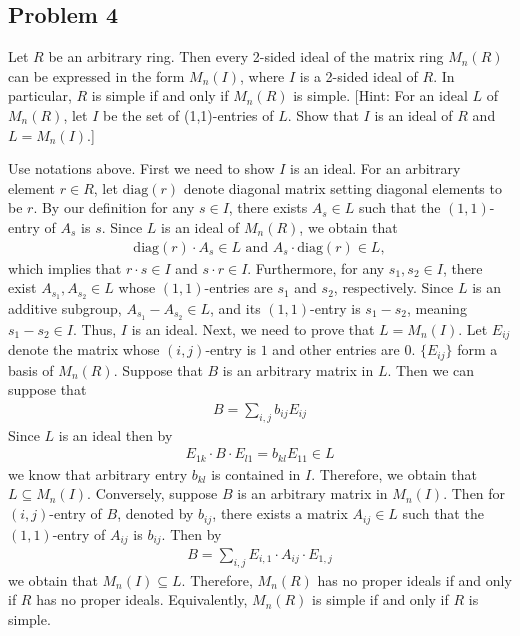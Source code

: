 \subsection*{Problem 4}
Let $R$ be an arbitrary ring. Then every 2-sided ideal of the matrix ring $M_n(R)$ can be expressed in the form $M_n(I)$, where $I$ is a 2-sided ideal of $R$. In particular, $R$ is simple if and only if $M_n(R)$ is simple. [Hint: For an ideal $L$ of $M_n(R)$, let $I$ be the set of (1,1)-entries of $L$. Show that $I$ is an ideal of $R$ and $L = M_n(I)$.]

\begin{solution}
    Use notations above.
    First we need to show $I$ is an ideal. 
    For an arbitrary element $r\in R$, let $\text{diag}(r)$ denote diagonal matrix setting diagonal elements to be $r$.
    By our definition for any $s\in I$, there exists $A_s\in L$ such that the $(1,1)$-entry of $A_s$ is $s$.
    Since $L$ is an ideal of $M_n(R)$,
    we obtain that 
    \begin{align*}
        \text{diag}(r)\cdot  A_s\in L\text{ and }A_s\cdot\text{diag}(r)  \in L,
    \end{align*} 
    which implies that $r\cdot s\in I$ and $s\cdot r\in I$.
    Furthermore, for any $s_1, s_2 \in I$, there exist $A_{s_1}, A_{s_2} \in L$ whose $(1,1)$-entries are $s_1$ and $s_2$, respectively. Since $L$ is an additive subgroup, $A_{s_1} - A_{s_2} \in L$, and its $(1,1)$-entry is $s_1 - s_2$, meaning $s_1 - s_2 \in I$.
    Thus, $I$ is an ideal. 
    Next, we need to prove that $L=M_n(I)$. Let $E_{ij}$ denote the matrix whose $(i,j)$-entry is $1$ and other entries are $0$. $\{E_{ij}\}$ form a basis of $M_n(R)$. 
    Suppose that $B$ is an arbitrary matrix in $L$. Then we can suppose that 
    \begin{align*}
        B = \sum_{i,j} b_{ij} E_{ij}
    \end{align*}
    Since $L$ is an ideal then by 
    \begin{align*}
        E_{1k}\cdot B\cdot E_{l1} = b_{kl}E_{11}\in L
    \end{align*}
    we know that arbitrary entry $b_{kl}$ is contained in $I$. Therefore, we obtain that $L\subseteq M_n(I)$.
    Conversely, suppose $B$ is an arbitrary matrix in $M_n(I)$. Then for $(i,j)$-entry of $B$, denoted by $b_{ij}$, there exists a matrix $A_{ij}\in L$ such
    that the $(1,1)$-entry of $A_{ij}$ is $b_{ij}$. Then by 
    \begin{align*}
        B = \sum_{i,j} E_{i,1}\cdot A_{ij}\cdot E_{1,j}
    \end{align*}
    we obtain that $M_n(I)\subseteq L$. 
    Therefore, $M_n(R)$ has no proper ideals if and only if $R$ has no proper ideals. Equivalently, $M_n(R)$ is simple if and only if $R$ is simple.
\end{solution}

